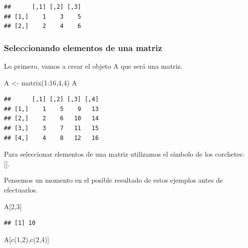 \documentclass[
]{book}
\newenvironment{Shaded}{\begin{snugshade}}{\end{snugshade}}
\newcommand{\DecValTok}[1]{\textcolor[rgb]{0.00,0.00,0.81}{#1}}
\newcommand{\FunctionTok}[1]{\textcolor[rgb]{0.00,0.00,0.00}{#1}}
\newcommand{\NormalTok}[1]{#1}
\newcommand{\OtherTok}[1]{\textcolor[rgb]{0.56,0.35,0.01}{#1}}
\newcommand{\SpecialCharTok}[1]{\textcolor[rgb]{0.00,0.00,0.00}{#1}}
\begin{document}
\begin{verbatim}
##      [,1] [,2] [,3]
## [1,]    1    3    5
## [2,]    2    4    6
\end{verbatim}

\hypertarget{seleccionando-elementos-de-una-matriz}{%
\subsubsection{Seleccionando elementos de una matriz}\label{seleccionando-elementos-de-una-matriz}}

Lo primero, vamos a crear el objeto A que será una matriz.

\begin{Shaded}
\begin{Highlighting}[]
\NormalTok{A }\OtherTok{\textless{}{-}} \FunctionTok{matrix}\NormalTok{(}\DecValTok{1}\SpecialCharTok{:}\DecValTok{16}\NormalTok{,}\DecValTok{4}\NormalTok{,}\DecValTok{4}\NormalTok{)}
\NormalTok{A}
\end{Highlighting}
\end{Shaded}

\begin{verbatim}
##      [,1] [,2] [,3] [,4]
## [1,]    1    5    9   13
## [2,]    2    6   10   14
## [3,]    3    7   11   15
## [4,]    4    8   12   16
\end{verbatim}

Para seleccionar elementos de una matriz utilizamos el símbolo de los corchetes: {[}{]}.

Pensemos un momento en el posible resultado de estos ejemplos antes de efectuarlos.

\begin{Shaded}
\begin{Highlighting}[]
\NormalTok{A[}\DecValTok{2}\NormalTok{,}\DecValTok{3}\NormalTok{]}
\end{Highlighting}
\end{Shaded}

\begin{verbatim}
## [1] 10
\end{verbatim}

\begin{Shaded}
\begin{Highlighting}[]
\NormalTok{A[}\FunctionTok{c}\NormalTok{(}\DecValTok{1}\NormalTok{,}\DecValTok{2}\NormalTok{),}\FunctionTok{c}\NormalTok{(}\DecValTok{2}\NormalTok{,}\DecValTok{4}\NormalTok{)]}
\end{Highlighting}
\end{Shaded}
\end{document}
